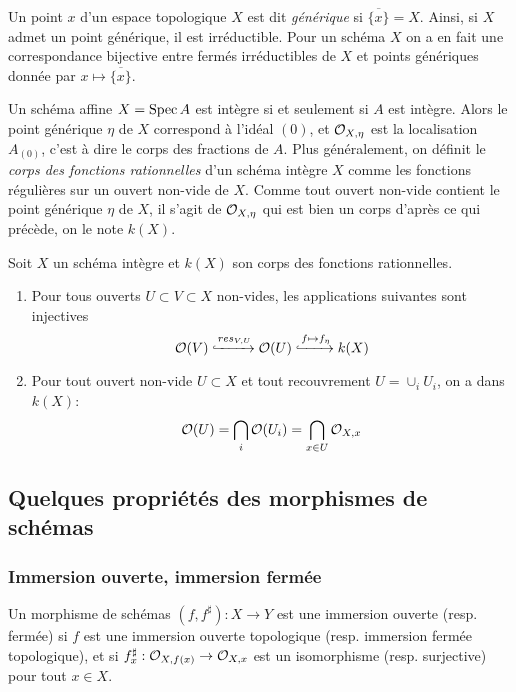 Un point $x$ d'un espace topologique $X$ est dit \textit{générique} si $\overline{\lbrace x\rbrace}=X$. Ainsi, si $X$ admet un point générique, il est irréductible. Pour un schéma $X$ on a en fait une correspondance bijective entre fermés irréductibles de $X$ et points génériques donnée par $x\mapsto \overline{\lbrace x\rbrace}$. 

Un schéma affine $X=\operatorname{Spec} A$ est intègre si et seulement si $A$ est intègre. Alors le point générique $\eta$ de $X$ correspond à l'idéal $(0)$, et $\mathcal{O}_{X,\eta}$ est la localisation $A_{(0)}$, c'est à dire le corps des fractions de $A$. Plus généralement, on définit le \textit{corps des fonctions rationnelles} d'un schéma intègre $X$ comme les fonctions régulières sur un ouvert non-vide de $X$. Comme tout ouvert non-vide contient le point générique $\eta$ de $X$, il s'agit de $\mathcal{O}_{X,\eta}$ qui est bien un corps d'après ce qui précède, on le note $k(X)$.

\begin{prop}
Soit $X$ un schéma intègre et $k(X)$ son corps des fonctions rationnelles. 
\begin{enumerate}
\item Pour tous ouverts $U\subset V\subset X$ non-vides, les applications suivantes sont injectives
$$\mathcal{O}(V)\xhookrightarrow{res_{V,U}}\mathcal{O}(U)\xhookrightarrow{f\mapsto f_\eta} k(X)$$
\item Pour tout ouvert non-vide $U\subset X$ et tout recouvrement $U=\cup_i U_i$, on a dans $k(X)$:
$$\mathcal{O}(U)=\bigcap_i \mathcal{O}(U_i)=\bigcap_{x\in U}\mathcal{O}_{X,x}$$
\end{enumerate}
\end{prop}

\subsection{Quelques propriétés des morphismes de schémas}

\subsubsection{Immersion ouverte, immersion fermée}

\begin{defn}
Un morphisme de schémas $(f,f^\sharp):X\rightarrow Y$ est une immersion ouverte (resp. fermée) si $f$ est une immersion ouverte topologique (resp. immersion fermée topologique), et si $f^\sharp_x:\mathcal{O}_{X,f(x)}\rightarrow \mathcal{O}_{X,x}$ est un isomorphisme (resp. surjective) pour tout $x\in X$.
\end{defn}

